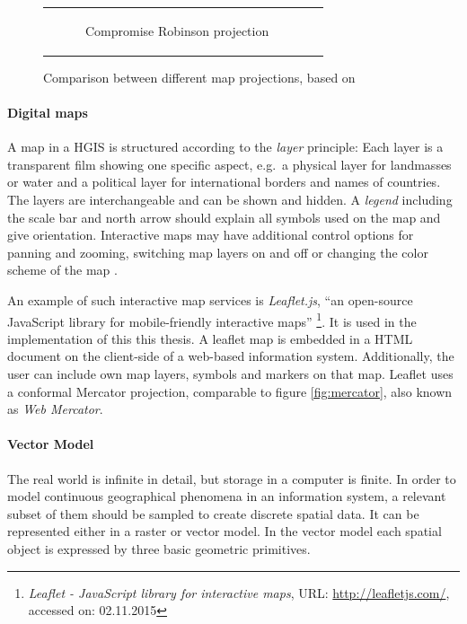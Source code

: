 \begin{figure}[H]
\begin{tabular}{c c}
\begin{subfigure}{0.5\textwidth}
      \caption{Compromise Robinson projection}
    \end{subfigure}
    & \\
  \end{tabular}
  \caption{Comparison between different map projections, based on \cite{mapProjections}}
  \label{fig:map_projections}
\end{figure}


\paragraph{Digital maps} %
\label{par:maps}

A map in a HGIS is structured according to the \emph{layer} principle: Each layer is a transparent film showing one specific aspect, e.g.\ a physical layer for landmasses or water and a political layer for international borders and names of countries. The layers are interchangeable and can be shown and hidden. A \emph{legend} including the scale bar and north arrow should explain all symbols used on the map and give orientation. Interactive maps may have additional control options for panning and zooming, switching map layers on and off or changing the color scheme of the map
\cite[pp. 159-166]{bolstad2008gis}.

An example of such interactive map services is \emph{Leaflet.js}, ``an open-source JavaScript library for mobile-friendly interactive maps''
\footnote{
  \textit{Leaflet - JavaScript library for interactive maps},
  URL: \url{http://leafletjs.com/},
  accessed on: 02.11.2015
}.
It is used in the implementation of this this thesis. A leaflet map is embedded in a HTML document on the client-side of a web-based information system. Additionally, the user can include own map layers, symbols and markers on that map. Leaflet uses a conformal Mercator projection, comparable to figure \ref{fig:mercator}, also known as \emph{Web Mercator}.

\paragraph{Vector Model} %
\label{ssub:vector_model}

The real world is infinite in detail, but storage in a computer is finite. In order to model continuous geographical phenomena in an information system, a relevant subset of them should be sampled to create discrete spatial data. It can be represented either in a raster or vector model. In the vector model each spatial object is expressed by three basic geometric primitives.

